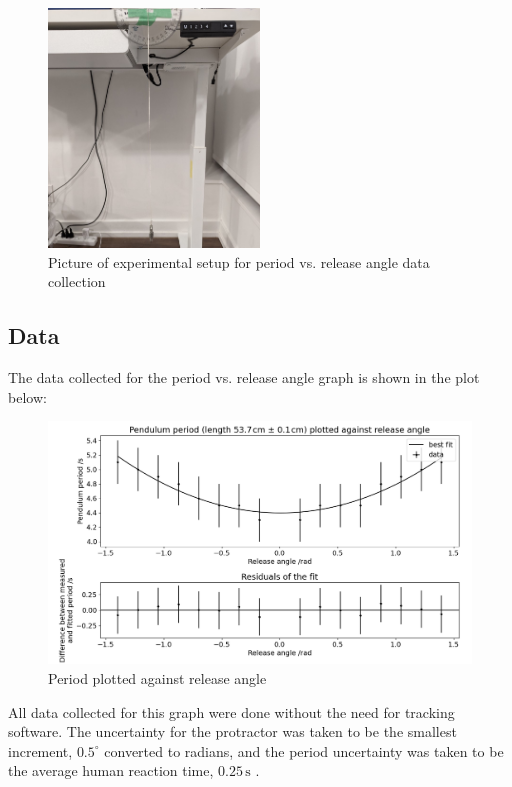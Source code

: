 \documentclass[12pt]{article}
\begin{document}
\begin{figure}[!hptb]
    \centering
    \includegraphics[width=0.5\textwidth]{../figures/exp_setup1.jpg}
    \caption{\centering Picture of experimental setup for period vs. release angle data collection}
    \label{fig:figure 1}
\end{figure}

\newpage

\subsection{Data}
The data collected for the period vs. release angle graph is shown in the plot below:

\begin{figure}[!hptb]
    \centering
    \includegraphics[width=\textwidth]{../figures/period_vs_release_angle.png}
    \caption{\centering Period plotted against release angle}
    \label{fig:figure 2}
\end{figure}

All data collected for this graph were done without the need for tracking software. The uncertainty for the protractor was taken to be the smallest increment, $0.5^{\circ}$ converted to radians, and the period uncertainty was taken to be the average human reaction time, $0.25\,\text{s}$ \cite{reaction-time}.
\end{document}
